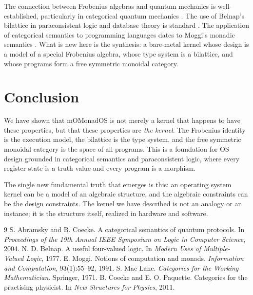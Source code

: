 \documentclass[11pt,a4paper]{article}
\theoremstyle{definition}
\begin{document}
The connection between Frobenius algebras and quantum mechanics is well-established, particularly in categorical quantum mechanics \cite{AbramskyCoecke}. The use of Belnap's bilattice in paraconsistent logic and database theory is standard \cite{Belnap1977}. The application of categorical semantics to programming languages dates to Moggi's monadic semantics \cite{Moggi1991}. What is new here is the synthesis: a bare-metal kernel whose design is a model of a special Frobenius algebra, whose type system is a bilattice, and whose programs form a free symmetric monoidal category.

\section{Conclusion}

We have shown that mOMonadOS is not merely a kernel that happens to have these properties, but that these properties are \emph{the kernel}. The Frobenius identity is the execution model, the bilattice is the type system, and the free symmetric monoidal category is the space of all programs. This is a foundation for OS design grounded in categorical semantics and paraconsistent logic, where every register state is a truth value and every program is a morphism.

The single new fundamental truth that emerges is this: an operating system kernel can be a model of an algebraic structure, and the algebraic constraints can be the design constraints. The kernel we have described is not an analogy or an instance; it is the structure itself, realized in hardware and software.

\begin{thebibliography}{9}
 S. Abramsky and B. Coecke. A categorical semantics of quantum protocols. In \emph{Proceedings of the 19th Annual IEEE Symposium on Logic in Computer Science}, 2004.
 N. D. Belnap. A useful four-valued logic. In \emph{Modern Uses of Multiple-Valued Logic}, 1977.
 E. Moggi. Notions of computation and monads. \emph{Information and Computation}, 93(1):55–92, 1991.
 S. Mac Lane. \emph{Categories for the Working Mathematician}. Springer, 1971.
 B. Coecke and E. O. Paquette. Categories for the practising physicist. In \emph{New Structures for Physics}, 2011.
\end{thebibliography}
\end{document}
